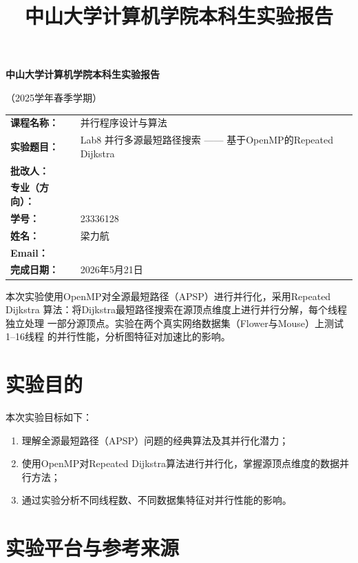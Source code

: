 \documentclass[UTF8,a4paper,12pt,fontset=none]{ctexart}
\title{\bfseries 中山大学计算机学院本科生实验报告}
\author{}
\date{}
\begin{document}
\begin{titlepage}
  \centering
  {\bfseries 中山大学计算机学院本科生实验报告\par}
  \vspace{0.5em}
  {（2025学年春季学期）\par}
  \vspace{2em}

  \begin{tabularx}{0.9\textwidth}{>{\bfseries}p{4cm}X}
    课程名称： & 并行程序设计与算法 \\
    实验题目： & Lab8 并行多源最短路径搜索 —— 基于OpenMP的Repeated Dijkstra \\
    批改人： & \\
    专业（方向）： & \\
    学号： & 23336128 \\
    姓名： & 梁力航 \\
    Email： & \\
    完成日期： & 2026年5月21日 \\
  \end{tabularx}

  \vfill
  \begin{minipage}{0.88\textwidth}
    \small
    本次实验使用OpenMP对全源最短路径（APSP）进行并行化，采用Repeated Dijkstra
    算法：将Dijkstra最短路径搜索在源顶点维度上进行并行分解，每个线程独立处理
    一部分源顶点。实验在两个真实网络数据集（Flower与Mouse）上测试1--16线程
    的并行性能，分析图特征对加速比的影响。
  \end{minipage}
\end{titlepage}

\section{实验目的}

本次实验目标如下：
\begin{enumerate}[leftmargin=2.2em]
  \item 理解全源最短路径（APSP）问题的经典算法及其并行化潜力；
  \item 使用OpenMP对Repeated Dijkstra算法进行并行化，掌握源顶点维度的数据并行方法；
  \item 通过实验分析不同线程数、不同数据集特征对并行性能的影响。
\end{enumerate}

\section{实验平台与参考来源}
\end{document}
